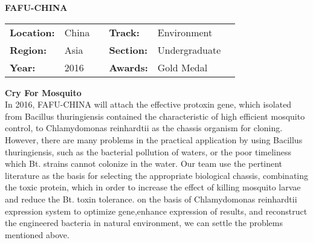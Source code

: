 \noindent\textbf{\uppercase{FAFU-CHINA}} 
\FloatBarrier
\begin{table}[h]
\begin{tabular}{lp{2.5cm}llll}
\textbf{Location:} & China & \multicolumn{1}{|l}{} & \textbf{Track:}   & Environment \\
\textbf{Region:}   & Asia   & \multicolumn{1}{|l}{} & \textbf{Section:} & Undergraduate \\
\textbf{Year:}     & 2016   & \multicolumn{1}{|l}{} & \textbf{Awards:}  & Gold Medal
\end{tabular}
\end{table} 
\FloatBarrier
\noindent\textbf{Cry For Mosquito} \vspace{.2cm}\\
In 2016, FAFU-CHINA will attach the effective protoxin gene, which isolated from Bacillus thuringiensis contained the characteristic of high efficient mosquito control, to Chlamydomonas reinhardtii as the chassis organism for cloning. However, there are many problems in the practical application by using Bacillus thuringiensis, such as the bacterial pollution of waters, or the poor timeliness which Bt. strains cannot colonize in the water. Our team use the pertinent literature as the basis for selecting the appropriate biological chassis, combinating the toxic protein, which in order to increase the effect of killing mosquito larvae and reduce the Bt. toxin tolerance. on the basis of Chlamydomonas reinhardtii expression system to optimize gene,enhance expression of results, and reconstruct the engineered bacteria in natural environment, we can settle the problems mentioned above. 
\vspace{2cm} $ $
\pagebreak

